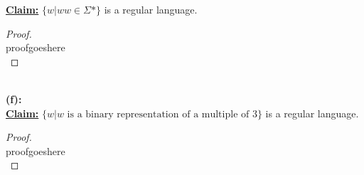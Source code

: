 \documentclass[12pt]{article}
\begin{document}
\textbf{\underline{Claim:}} $\{ w | ww \in \Sigma* \}$ is a regular language.
\begin{proof}
\leavevmode\\
    proofgoeshere \\
\end{proof}
\leavevmode\\
\textbf{(f):} \\
\textbf{\underline{Claim:}} $\{ w | w \text{ is a binary representation of a multiple of 3} \}$ is a regular language.
\begin{proof}
\leavevmode\\
    proofgoeshere \\
\end{proof}
\leavevmode\\
\pagebreak
\end{document}
